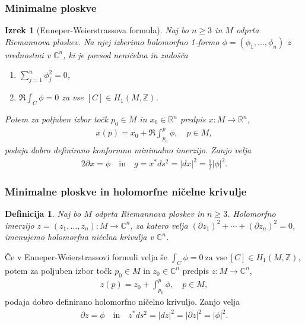 \documentclass[9pt, table]{beamer}
\newtheorem{izrek}{Izrek}
\newtheorem{definicija}{Definicija}
\newcommand{\R}{\mathbb R}
\newcommand{\Z}{\mathbb Z}
\newcommand{\C}{\mathbb C}
\begin{document}
\begin{frame}
\frametitle{Minimalne ploskve}

\begin{izrek}[Enneper-Weierstrassova formula]
Naj bo $n \geq 3$ in $M$ odprta Riemannova ploskev. Na njej izberimo holomorfno 1-formo $\phi = (\phi_{1}, \dots , \phi_{n})$ z vrednostmi v $\C^{n}$, ki je povsod neničelna in zadošča 
\begin{enumerate}
\item $ \sum_{j=1}^{n} \phi_{j}^{2} = 0$,
\item $ \Re \int_{C} \phi = 0 $ za vse $[C] \in H_{1} (M, \Z)$.
\end{enumerate}
Potem za poljuben izbor točk $p_0 \in M$ in $x_0 \in \R^{n}$ predpis $x \colon M \to \R^{n}$,
\begin{align}
x(p) = x_0 + \Re \int_{p_0}^{p} \phi, \quad p \in M,
\end{align}
podaja dobro definirano konformno minimalno imerzijo. Zanjo velja
\begin{align}
2 \partial{x} = \phi \quad \text{in} \quad g = x^{*} ds^2 = |dx|^2 = \frac{1}{2} |\phi|^2.
\end{align}
\end{izrek}

\end{frame}


\begin{frame}
\frametitle{Minimalne ploskve in holomorfne ničelne krivulje}

\begin{definicija}
Naj bo $M$ odprta Riemannova ploskev in $n \geq 3$. Holomorfno imerzijo $z = (z_{1}, \dots , z_{n}) \colon M \to \C^{n}$, za katero velja
$(\partial{z_{1}})^2 + \cdots + (\partial{z_{n}})^2 = 0$, imenujemo {\color{blue} holomorfna ničelna krivulja} v $\C^{n}$.
\end{definicija}
\vspace{0.3cm}
\pause

Če v Enneper-Weierstrassovi formuli velja še
$ \int_{C} \phi = 0 \ \text{za vse} \ [C] \in H_{1} (M, \Z) $,
potem za poljuben izbor točk $p_0 \in M$ in $z_0 \in \C^{n}$ predpis $z \colon M \to \C^{n}$,
\begin{align}
z(p) = z_0 + \int_{p_0}^{p} \phi, \quad p \in M,
\end{align}
podaja dobro definirano holomorfno ničelno krivuljo. Zanjo velja
\begin{align}
\partial{z} = \phi \quad \text{in} \quad z^{*} ds^2 = |dz|^2 = |\partial{z}|^2 = |\phi|^2.
\end{align}

\end{frame}
\end{document}
